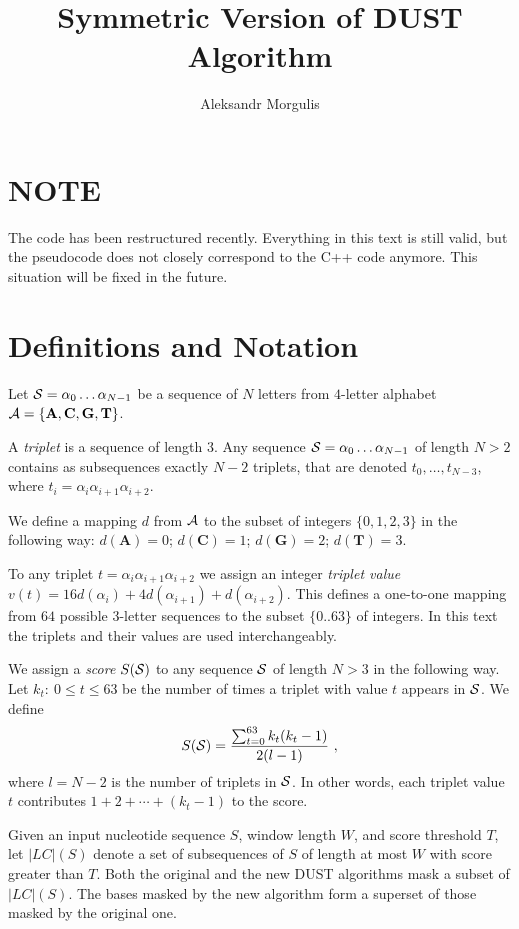 \documentclass{article}
\title{Symmetric Version of DUST Algorithm}
\author{Aleksandr Morgulis}
\newcommand{\al}[1]{\alpha_{#1}}
\newcommand{\sq}[2]{\al{#1}\ldots\al{#2}}
\newcommand{\cala}{{\cal A}}
\newcommand{\cals}{{\cal S}}
\begin{document}
\maketitle
\tableofcontents

\section*{NOTE}

The code has been restructured recently. Everything in this text is still
valid, but the pseudocode does not closely correspond to the C++ code 
anymore. This situation will be fixed in the future.

\section{Definitions and Notation}

Let ${\cal S} = \sq{0}{N-1}$  be a sequence of $N$ letters from $4$-letter 
alphabet $\cala = \{ \mathbf A, \mathbf C, \mathbf G, \mathbf T \}$.

A {\em triplet} is a sequence of length $3$. Any sequence $\cals = \sq{0}{N-1}$ 
of length $N > 2$ contains as subsequences exactly $N-2$ triplets, that are 
denoted $t_{0},\ldots,t_{N-3}$, where $t_i = \al{i}\al{i+1}\al{i+2}$.

We define a mapping $d$ from $\cala$ to the subset of integers 
$\{0, 1, 2, 3\}$ in the following way: $d(\mathbf A) = 0$; $d(\mathbf C) = 1$; 
$d(\mathbf G) = 2$; $d(\mathbf T) = 3$.

To any triplet $t = \al{i}\al{i+1}\al{i+2}$ we assign an integer 
{\em triplet value} $v(t) = 16d(\al{i}) + 4d(\al{i+1}) + d(\al{i+2})$. This 
defines a one-to-one mapping from $64$ possible 3-letter sequences to the subset 
$\{0..63\}$ of integers.  In this text the triplets and their values are used 
interchangeably.

We assign a {\em score} $S(\cals)$ to any sequence $\cals$ of length $N > 3$ in 
the following way. Let $k_t :\ 0 \le t \le 63$ be the number of times a triplet 
with value $t$ appears in $\cals$. We define
$$
S(\cals) = \frac{\sum_{t=0}^{63}{k_t(k_t - 1)}}{2(l - 1)} \rm{\ ,}
$$
where $l = N - 2$ is the number of triplets in $\cals$. In other words, each
triplet value $t$ contributes $1 + 2 + \cdots + (k_t - 1)$ to the score.

Given an input nucleotide sequence $S$, window length $W$, and score threshold
$T$, let $|LC|(S)$ denote a set of subsequences of $S$ of length at most $W$ with
score greater than $T$. Both the original and the new DUST algorithms mask a subset 
of $|LC|(S)$. The bases masked by the new algorithm form a superset of those masked 
by the original one.
\end{document}
